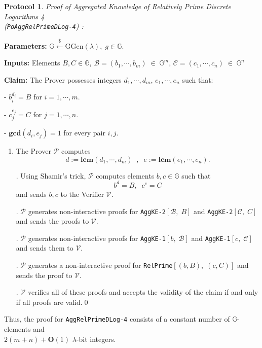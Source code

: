 \documentclass[11pt, lettersize, notitlepage, leqno, footskip=0.6cm]{article}
\newcommand{\mc}{\mathcal}
\newcommand{\mb}{\mathbb}
\newcommand{\mbf}{\mathbf}
\newcommand{\mr}{\mathrm}
\newcommand{\lam}{\lambda}
\newcommand{\lamb}{\lambda}
\newcommand{\bO}{\mbf{O}}
\newcommand{\mP}{\mc{P}}
\newcommand{\vs}{\vspace{-0.15cm}}
\newcommand{\LCM}{\mbf{lcm}}
\newcommand{\GCD}{\mbf{gcd}}
\newtheorem{Prot}[Thm]{Protocol}
\numberwithin{equation}{section}
\begin{document}
\begin{Prot} \normalfont \textit{Proof of Aggregated Knowledge of Relatively Prime Discrete Logarithms} 4\\ (\verb|PoAggRelPrimeDLog-4|) :\end{Prot}\vspace{-0.3cm}

\noindent \textbf{Parameters:} $\mb{G}\xleftarrow{\$} \mr{GGen}(\lamb), \; g\in \mb{G}$.

\noindent \textbf{Inputs:} Elements $B, C\in \mb{G}$,\;  $\mc{B} = (b_1,\cdots, b_m)\;\in\;\mb{G}^m$,\;\; $\mc{C} = (c_1,\cdots, c_n)\;\in\;\mb{G}^n$

\noindent \textbf{Claim:} The Prover possesses integers $ d_1,\cdots, d_m$,\; $e_1,\cdots,e_n$ such that:

\noindent - $b_i^{d_i} = B$ for $i = 1,\cdots, m$.

\noindent - $c_j^{e_j} = C$ for $j = 1,\cdots, n$.

\noindent - $\GCD(d_i, e_j) = 1$ for every pair $i, j$.

\begin{enumerate}[wide, labelwidth=!, labelindent=0pt]\vs \item The Prover $\mc{P}$ computes \vs $${d}:= \LCM(d_1,\cdots,d_m)\;\;,\;\; {e}:= \LCM(e_1,\cdots,e_n).$$

. Using Shamir's trick, $\mP$ computes elements $b, c \in \mb{G}$ such that \vspace{-0.15cm}$$b^{d} = B,\;\; c^{e} = C$$ and sends $b,c$ to the Verifier $\mc{V}$.

. $\mc{P}$ generates non-interactive proofs for \verb|AggKE-2|$[\mc{B},\; B]$ and \verb|AggKE-2|$[\mc{C},\; C]$ and sends the proofs to $\mc{V}$.

. $\mc{P}$ generates non-interactive proofs for \verb|AggKE-1|$[b,\;\mc{B}]$ and \verb|AggKE-1|$[c,\; \mc{C}]$ and sends them to $\mc{V}$.

. $\mc{P}$ generates a non-interactive proof for \verb|RelPrime|$[(b,B),\;(c,C)]$ and sends the proof to $\mc{V}$.

. $\mc{V}$ verifies all of these proofs and accepts the validity of the claim if and only if all proofs are valid.\qed \end{enumerate}

\noindent Thus, the proof for \verb|AggRelPrimeDLog-4| consists of a constant number of $\mb{G}$-elements and \\$2(m+n)+\bO(1)$ $\lam$-bit integers.
\end{document}
